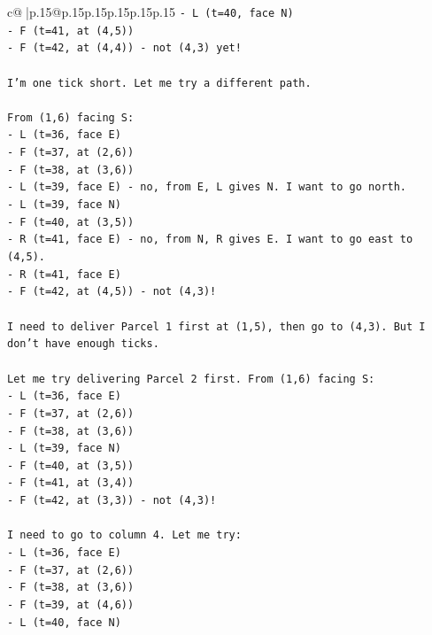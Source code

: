 \documentclass{article}
\begin{document}
{\begin{supertabular}{c@{$\;$}|p{.15\linewidth}@{}p{.15\linewidth}p{.15\linewidth}p{.15\linewidth}p{.15\linewidth}p{.15\linewidth}}
{{{\texttt{{-} L (t=40, face N)} \\
\texttt{{-} F (t=41, at (4,5))} \\
\texttt{{-} F (t=42, at (4,4)) {-} not (4,3) yet!} \\
\\ 
\texttt{I'm one tick short. Let me try a different path.} \\
\\ 
\texttt{From (1,6) facing S:} \\
\texttt{{-} L (t=36, face E)} \\
\texttt{{-} F (t=37, at (2,6))} \\
\texttt{{-} F (t=38, at (3,6))} \\
\texttt{{-} L (t=39, face E) {-} no, from E, L gives N. I want to go north.} \\
\texttt{{-} L (t=39, face N)} \\
\texttt{{-} F (t=40, at (3,5))} \\
\texttt{{-} R (t=41, face E) {-} no, from N, R gives E. I want to go east to (4,5).} \\
\texttt{{-} R (t=41, face E)} \\
\texttt{{-} F (t=42, at (4,5)) {-} not (4,3)!} \\
\\ 
\texttt{I need to deliver Parcel 1 first at (1,5), then go to (4,3). But I don't have enough ticks.} \\
\\ 
\texttt{Let me try delivering Parcel 2 first. From (1,6) facing S:} \\
\texttt{{-} L (t=36, face E)} \\
\texttt{{-} F (t=37, at (2,6))} \\
\texttt{{-} F (t=38, at (3,6))} \\
\texttt{{-} L (t=39, face N)} \\
\texttt{{-} F (t=40, at (3,5))} \\
\texttt{{-} F (t=41, at (3,4))} \\
\texttt{{-} F (t=42, at (3,3)) {-} not (4,3)!} \\
\\ 
\texttt{I need to go to column 4. Let me try:} \\
\texttt{{-} L (t=36, face E)} \\
\texttt{{-} F (t=37, at (2,6))} \\
\texttt{{-} F (t=38, at (3,6))} \\
\texttt{{-} F (t=39, at (4,6))} \\
\texttt{{-} L (t=40, face N)} \\
}}}
\end{supertabular}}
\end{document}
